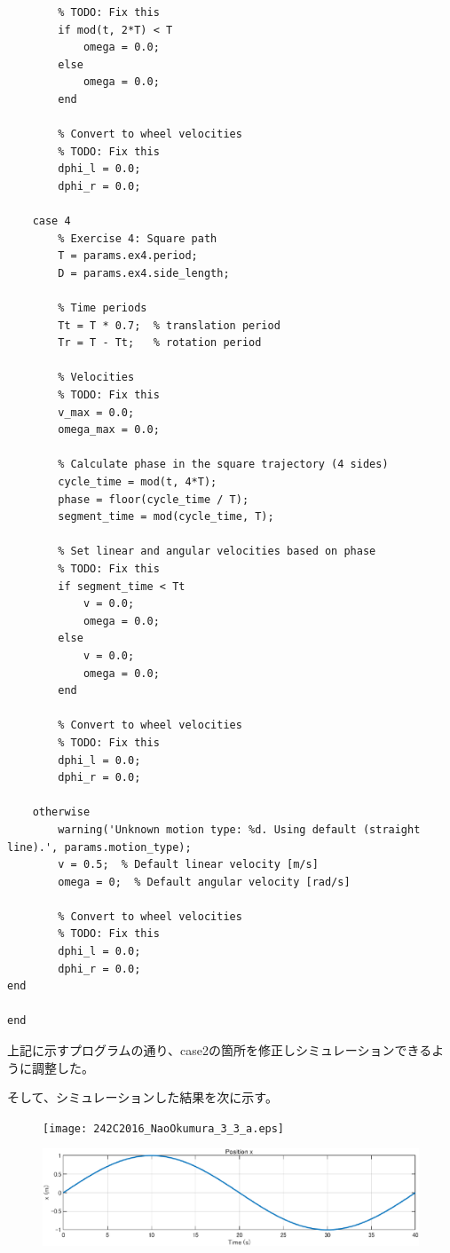 \documentclass[10pt,a4paper,titlepage]{jreport} %
\begin{document}
\begin{lstlisting}[caption=modified＿mobile＿robot＿controller.m]
        % Angular velocity depends on time
        % TODO: Fix this
        if mod(t, 2*T) < T
            omega = 0.0;
        else
            omega = 0.0;
        end
        
        % Convert to wheel velocities
        % TODO: Fix this
        dphi_l = 0.0;
        dphi_r = 0.0;
        
    case 4
        % Exercise 4: Square path
        T = params.ex4.period;
        D = params.ex4.side_length;
        
        % Time periods
        Tt = T * 0.7;  % translation period
        Tr = T - Tt;   % rotation period
        
        % Velocities
        % TODO: Fix this
        v_max = 0.0;
        omega_max = 0.0;
        
        % Calculate phase in the square trajectory (4 sides)
        cycle_time = mod(t, 4*T);
        phase = floor(cycle_time / T);
        segment_time = mod(cycle_time, T);
        
        % Set linear and angular velocities based on phase
        % TODO: Fix this
        if segment_time < Tt
            v = 0.0;
            omega = 0.0;
        else
            v = 0.0;
            omega = 0.0;
        end
        
        % Convert to wheel velocities
        % TODO: Fix this
        dphi_l = 0.0;
        dphi_r = 0.0;
        
    otherwise
        warning('Unknown motion type: %d. Using default (straight line).', params.motion_type);
        v = 0.5;  % Default linear velocity [m/s]
        omega = 0;  % Default angular velocity [rad/s]
        
        % Convert to wheel velocities
        % TODO: Fix this
        dphi_l = 0.0;
        dphi_r = 0.0;
end

end
\end{lstlisting}

上記に示すプログラムの通り、case2の箇所を修正しシミュレーションできるように調整した。

そして、シミュレーションした結果を次に示す。

\begin{figure}[H] %
  \centering
  \texttt{[image: 242C2016\_NaoOkumura\_3\_3\_a.eps]} %
\end{figure}

\begin{figure}[H] %
  \centering
  \includegraphics[width=0.6\linewidth]{242C2016_NaoOkumura_3_3_b.eps} %
\end{figure}
\end{document}
